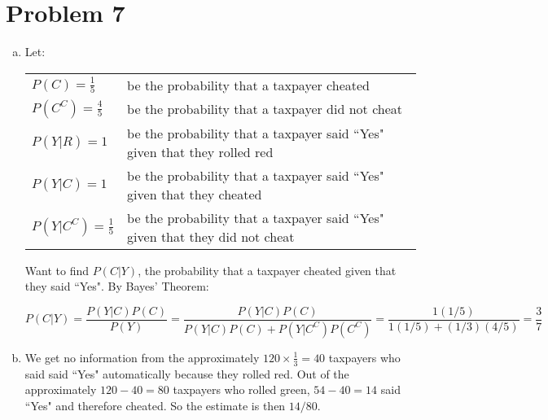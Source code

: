 \documentclass{article}
\begin{document}
\section{Problem 7}
\begin{enumerate}[(a)]
\item
Let:

\vspace{3px}

\begin{tabular}{l l}
$P(C) = \frac{1}{5}$ & be the probability that a taxpayer cheated \\
$P(C^C) = \frac{4}{5}$ & be the probability that a taxpayer did not cheat \\
$P(Y|R) = 1$ & be the probability that a taxpayer said ``Yes" given that
they rolled red \\
$P(Y|C) = 1$ & be the probability that a taxpayer said ``Yes" given
that they cheated \\
$P(Y|C^C) = \frac{1}{5}$ & be the probability that a taxpayer said ``Yes" given
that they did not cheat \\
\end{tabular}

\vspace{1em}

Want to find $P(C|Y)$, the probability that a taxpayer cheated given that they
said ``Yes". By Bayes' Theorem:

\[
P(C|Y) = \frac{P(Y|C)P(C)}{P(Y)} = 
 \frac{P(Y|C)P(C)}{P(Y|C)P(C) + P(Y|C^C)P(C^C)} =
 \frac{1(1/5)}{1(1/5) + (1/3)(4/5)} = \frac{3}{7} 
\]

\item
We get no information from the approximately $120 \times \frac{1}{3} = 40$
taxpayers who said said ``Yes" automatically because they rolled red. Out of the
approximately $120 - 40 = 80$ taxpayers who rolled green, $54 - 40 = 14$ said
``Yes" and therefore cheated. So the estimate is then $14/80$.

\end{enumerate}
\end{document}
